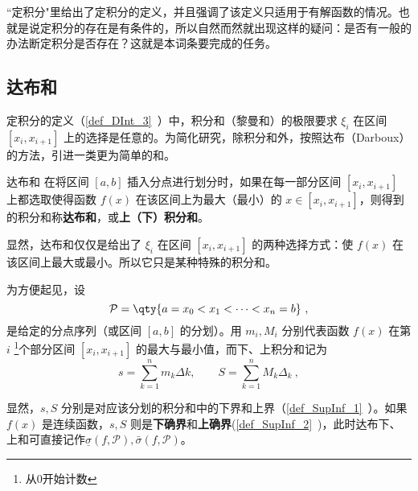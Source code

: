 
“定积分"里给出了定积分的定义，并且强调了该定义只适用于有解函数的情况。也就是说定积分的存在是有条件的，所以自然而然就出现这样的疑问：是否有一般的办法断定积分是否存在？这就是本词条要完成的任务。
\subsection{达布和}
定积分的定义（\autoref{def_DInt_3}~）中，积分和（黎曼和）的极限要求 $\xi_i$ 在区间 $[x_i,x_{i+1}]$ 上的选择是任意的。为简化研究，除积分和外，按照达布（Darboux）的方法，引进一类更为简单的和。
\begin{definition}{达布和}
在将区间 $[a,b]$ 插入分点进行划分时，如果在每一部分区间 $[x_i,x_{i+1}]$ 上都选取使得函数 $f(x)$ 在该区间上为最大（最小）的 $x\in[x_i,x_{i+1}]$，则得到的积分和称\textbf{达布和}，或\textbf{上（下）积分和}。
\end{definition}
显然，达布和仅仅是给出了 $\xi_i$ 在区间 $[x_i,x_{i+1}]$ 的两种选择方式：使 $f(x)$ 在该区间上最大或最小。所以它只是某种特殊的积分和。

为方便起见，设
\begin{equation}
\mathcal P = \qty{a = x_0 < x_1 < \dots < x_n = b}~,
\end{equation}
是给定的分点序列（或区间 $[a,b]$ 的分划）。用 $m_i,M_i$ 分别代表函数 $f(x)$ 在第 $i$ \footnote{从0开始计数}个部分区间 $[x_i,x_{i+1}]$ 的最大与最小值，而下、上积分和记为
\begin{equation}
s= \sum_{k = 1}^n m_k\Delta k, \qquad  S = \sum_{k = 1}^n M_k \Delta_k~,
\end{equation}

显然，$s,S$ 分别是对应该分划的积分和中的下界和上界（\autoref{def_SupInf_1}~）。如果 $f(x)$ 是连续函数，$s,S$ 则是\textbf{下确界}和\textbf{上确界}(\autoref{def_SupInf_2}~)，此时达布下、上和可直接记作$\underline \sigma(f, \mathcal P),\bar \sigma(f, \mathcal P) $。
